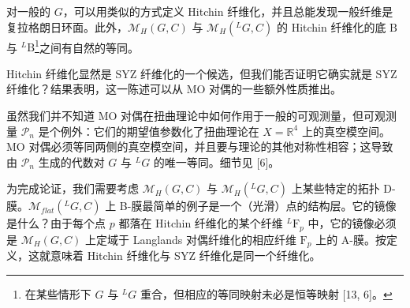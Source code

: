 \documentclass[11pt,a4paper,UTF8]{ctexart}
\begin{document}



对一般的 $G$，可以用类似的方式定义 Hitchin 纤维化，并且总能发现一般纤维是复拉格朗日环面。此外，$\mathcal{M}_{H}(G,C)$ 与 $\mathcal{M}_{H}({}^{L}G,C)$ 的 Hitchin 纤维化的底 $\mathrm{B}$ 与 ${}^{L}\mathrm{B}$\footnote{在某些情形下 $G$ 与 ${}^{L}G$ 重合，但相应的等同映射未必是恒等映射 [13, 6]。}之间有自然的等同。


Hitchin 纤维化显然是 SYZ 纤维化的一个候选，但我们能否证明它确实就是 SYZ 纤维化？结果表明，这一陈述可以从 MO 对偶的一些额外性质推出。

虽然我们并不知道 MO 对偶在扭曲理论中如何作用于一般的可观测量，但可观测量 $\mathcal{P}_{n}$ 是个例外：它们的期望值参数化了扭曲理论在 $X=\mathbb{R}^{4}$ 上的真空模空间。MO 对偶必须等同两侧的真空模空间，并且要与理论的其他对称性相容；这导致由 $\mathcal{P}_{n}$ 生成的代数对 $G$ 与 ${}^{L}G$ 的唯一等同。细节见 [6]。


为完成论证，我们需要考虑 $\mathcal{M}_{H}(G,C)$ 与 $\mathcal{M}_{H}({}^{L}G,C)$ 上某些特定的拓扑 D-膜。$\mathcal{M}_{flat}({}^{L}G,C)$ 上 B-膜最简单的例子是一个（光滑）点的结构层。它的镜像是什么？由于每个点 $p$ 都落在 Hitchin 纤维化的某个纤维 ${}^{L}\mathrm{F}_{p}$ 中，它的镜像必须是 $\mathcal{M}_{H}(G,C)$ 上定域于 Langlands 对偶纤维化的相应纤维 $\mathrm{F}_{p}$ 上的 A-膜。按定义，这就意味着 Hitchin 纤维化与 SYZ 纤维化是同一个纤维化。
\end{document}
